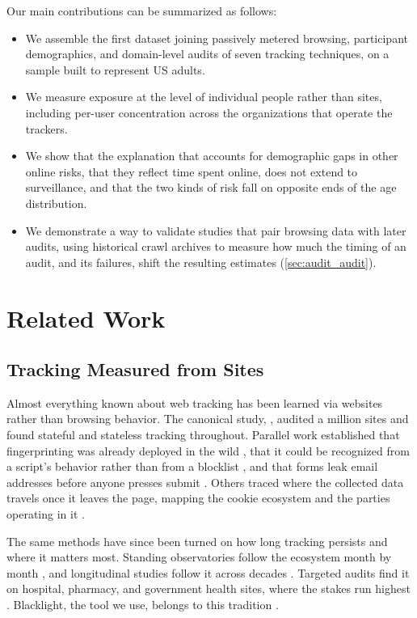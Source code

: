 \documentclass[12pt, letterpaper]{article}
\begin{document}
Our main contributions can be summarized as follows:
\onehalfspacing
\begin{itemize}\itemsep2pt
    \item We assemble the first dataset joining passively metered browsing, participant demographics, and domain-level audits of seven tracking techniques, on a sample built to represent US adults.
    \item We measure exposure at the level of individual people rather than sites, including per-user concentration across the organizations that operate the trackers.
    \item We show that the explanation that accounts for demographic gaps in other online risks, that they reflect time spent online, does not extend to surveillance, and that the two kinds of risk fall on opposite ends of the age distribution.
    \item We demonstrate a way to validate studies that pair browsing data with later audits, using historical crawl archives to measure how much the timing of an audit, and its failures, shift the resulting estimates (\cref{sec:audit_audit}).
\end{itemize}
\doublespacing


\section{Related Work}
\label{sec:related}
 
\subsection{Tracking Measured from Sites}
Almost everything known about web tracking has been learned via websites rather than browsing behavior. The canonical study, \citet{Englehardt2016}, audited a million sites and found stateful and stateless tracking throughout. Parallel work established that fingerprinting was already deployed in the wild \citep{Acar2013, Nikiforakis2013, Acar2014, MS12}, that it could be recognized from a script's behavior rather than from a blocklist \citep{Iqbal2021}, and that forms leak email addresses before anyone presses submit \citep{leakyforms}. Others traced where the collected data travels once it leaves the page, mapping the cookie ecosystem and the parties operating in it \citep{SanchezRola2018, SanchezRola2021}. 

The same methods have since been turned on how long tracking persists and where it matters most. Standing observatories follow the ecosystem month by month \citep{karaj2018whotracks}, and longitudinal studies follow it across decades \citep{lerner2016internet, solomos2020clashtrackersmeasuringevolution}. Targeted audits find it on hospital, pharmacy, and government health sites, where the stakes run highest \citep{niforatos2021prevalence, zheutlin2021data, zheutlin2022data}. Blacklight, the tool we use, belongs to this tradition \citep{blacklight}.
\end{document}
